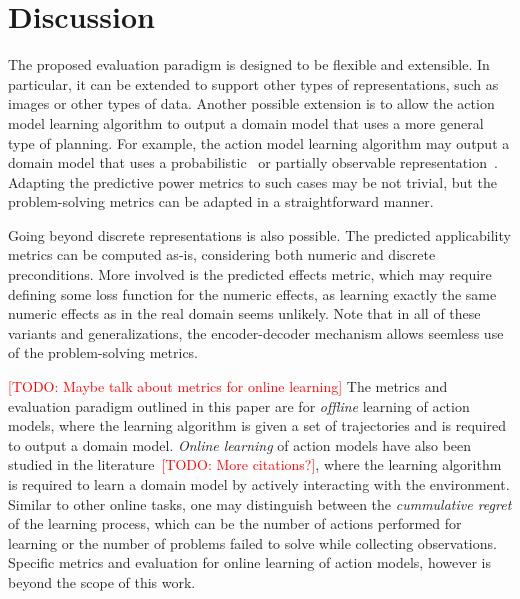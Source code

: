 \documentclass{article}
\theoremstyle{definition}
\theoremstyle{remark}
\newcommand{\todo}[1]{{\textcolor{red}{[TODO: #1]}}}
\begin{document}
\section{Discussion}
The proposed evaluation paradigm is designed to be flexible and extensible. 
In particular, it can be extended to support other types of representations, such as images or other types of data. 
Another possible extension is to allow the action model learning algorithm to output a domain model that uses a more general type of planning. 
For example, the action model learning algorithm may output a domain model that uses a probabilistic~\cite{xi2024neuro} or partially observable representation~\cite{le2024learning}. 
Adapting the predictive power metrics to such cases may be not trivial, but the problem-solving metrics can be adapted in a straightforward manner.


Going beyond discrete representations is also possible. 
The predicted applicability metrics can be computed as-is, considering both numeric and discrete preconditions.
More involved is the predicted effects metric, which may require defining some loss function for the numeric effects, as learning exactly the same numeric effects as in the real domain seems unlikely. 
Note that in all of these variants and generalizations, the encoder-decoder mechanism allows seemless use of the problem-solving metrics. 


\todo{Maybe talk about metrics for online learning}
The metrics and evaluation paradigm outlined in this paper are for \emph{offline} learning of action models, where the learning algorithm is given a set of trajectories and is required to output a domain model. \emph{Online learning} of action models have also been studied in the literature~\citep{lamanna2021online}\todo{More citations?}, where the learning algorithm is required to learn a domain model by actively interacting with the environment. Similar to other online tasks, one may distinguish between the \emph{cummulative regret} of the learning process, which can be the number of actions performed for learning or the number of problems failed to solve while collecting observations. 
Specific metrics and evaluation for online learning of action models, however is beyond the scope of this work. 
\end{document}
